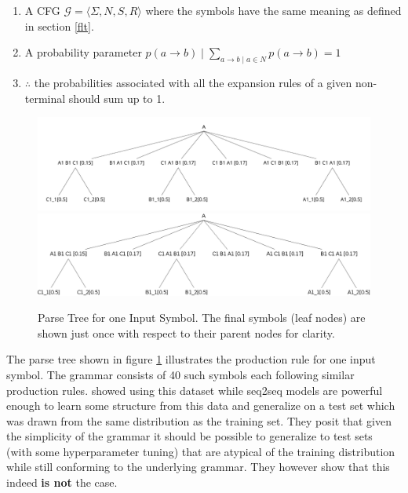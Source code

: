 \begin{enumerate}
	\item A CFG $\mathcal{G} = \langle \Sigma, N, S, R \rangle$ where the symbols have the same meaning as defined in section \ref{flt}.
	\item A probability parameter $p(a \rightarrow b) \mid \displaystyle \sum_{a \rightarrow b \mid a \in N} p(a \rightarrow b) = 1 $ 
	\item $\therefore$ the probabilities associated with all the expansion rules of a given non-terminal should sum up to 1.
\end{enumerate}

\begin{figure}
	\begin{minipage}[ht]{\textwidth}
		\ifpdf
		\includegraphics[width=\linewidth,keepaspectratio=true]{./figs/A-pdf}
		\else
		\includegraphics[width=\linewidth,keepaspectratio=true]{./figs/A-eps}
		\fi
		\caption{\small Parse Tree for one Input Symbol. The final symbols (leaf nodes) are shown just once with respect to their parent nodes for clarity.}
		\label{parse-tree}
	\end{minipage}
\end{figure}

The parse tree shown in figure \ref{parse-tree} illustrates the production rule for one input symbol. The grammar consists of 40 such symbols each following similar production rules. \cite{Weber2018} showed using this dataset while seq2seq models are powerful enough to learn some structure from this data and generalize on a test set which was drawn from the same distribution as the training set. They posit that given the simplicity of the grammar it should be possible to generalize to test sets (with some hyperparameter tuning) that are atypical of the training distribution while still conforming to the underlying grammar. They however show that this indeed \textbf{is not} the case.

